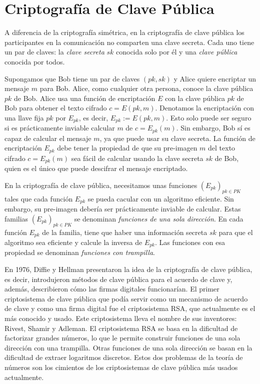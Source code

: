 \section{Criptografía de Clave Pública}

A diferencia de la criptografía simétrica, en la criptografía de clave pública los participantes en la comunicación no comparten una clave secreta. Cada uno tiene un par de claves: la \emph{clave secreta} $sk$ conocida solo por él y una \emph{clave pública} conocida por todos.

Supongamos que Bob tiene un par de claves $(pk, sk)$ y Alice quiere encriptar un mensaje $m$ para Bob. Alice, como cualquier otra persona, conoce la clave pública $pk$ de Bob. Alice usa una función de encriptación $E$ con la clave pública $pk$ de Bob para obtener el texto cifrado $c = E(pk, m)$. Denotamos la encriptación con una llave fija $pk$ por $E_{pk}$, es decir, $E_{pk} := E(pk, m)$. Esto solo puede ser seguro si es prácticamente inviable calcular $m$ de $c = E_{pk}(m)$. Sin embargo, Bob sí es capaz de calcular el mensaje $m$, ya que puede usar su clave secreta. La función de encriptación $E_{pk}$ debe tener la propiedad de que su pre-imagen $m$ del texto cifrado $c = E_{pk}(m)$ sea fácil de calcular usando la clave secreta $sk$ de Bob, quien es el único que puede descifrar el mensaje encriptado.

En la criptografía de clave pública, necesitamos unas funciones $\left( E_{pk} \right)_{pk \in PK}$ tales que cada función $E_{pk}$ se pueda cacular con un algoritmo eficiente. Sin embargo, su pre-imagen debería ser prácticamente inviable de calcular. Estas familias $\left( E_{pk} \right)_{pk \in PK}$ se denominan \emph{funciones de una sola dirección}. En cada función $E_{pk}$ de la familia, tiene que haber una información secreta $sk$ para que el algoritmo sea eficiente y calcule la inversa de $E_{pk}$. Las funciones con esa propiedad se denominan \emph{funciones con trampilla}.

En 1976, Diffie y Hellman presentaron la idea de la criptografía de clave pública, es decir, introdujeron métodos de clave pública para el acuerdo de clave y, además, describieron cómo las firmas digitales funcionarían. El primer criptosistema de clave pública que podía servir como un mecanismo de acuerdo de clave y como una firma digital fue el criptosistema RSA, que actualmente es el más conocido y usado. Este criptosistema lleva el nombre de sus inventores: Rivest, Shamir y Adleman. El criptosistema RSA se basa en la dificultad de factorizar grandes números, lo que le permite construir funciones de una sola dirección con una trampilla. Otras funciones de una sola dirección se basan en la dificultad de extraer logaritmos discretos. Estos dos problemas de la teoría de números son los cimientos de los criptosistemas de clave pública más usados actualmente.

